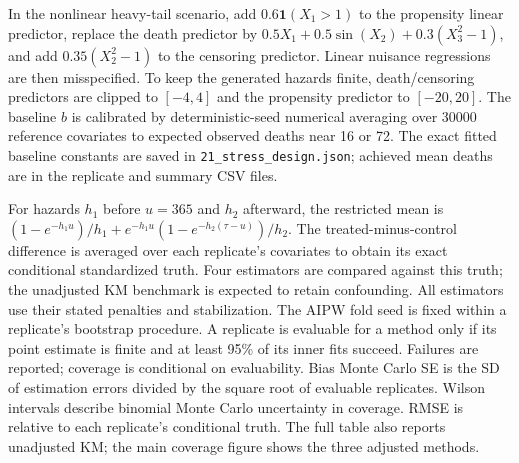 \documentclass[12pt,letterpaper]{article}
\begin{document}
In the nonlinear heavy-tail scenario, add $0.6\mathbf{1}(X_1>1)$ to the propensity linear predictor,
replace the death predictor by $0.5X_1+0.5\sin(X_2)+0.3(X_3^2-1)$, and add $0.35(X_2^2-1)$
to the censoring predictor. Linear nuisance regressions are then misspecified. To keep the generated
hazards finite, death/censoring predictors are clipped to $[-4,4]$ and the propensity predictor to $[-20,20]$.
The baseline $b$ is calibrated by deterministic-seed numerical averaging over 30000 reference covariates
to expected observed deaths near 16 or 72. The exact fitted baseline constants are saved in
\texttt{21\_stress\_design.json}; achieved mean deaths are in the replicate and summary CSV files.

For hazards $h_1$ before $u=365$ and $h_2$ afterward, the restricted mean is
$(1-e^{-h_1u})/h_1+e^{-h_1u}(1-e^{-h_2(\tau-u)})/h_2$.
The treated-minus-control difference is averaged over each replicate's covariates to obtain its exact
conditional standardized truth. Four estimators are compared against this truth; the unadjusted KM
benchmark is expected to retain confounding. All estimators use their stated penalties and stabilization.
The AIPW fold seed is fixed within a replicate's bootstrap procedure. A replicate is evaluable for a method
only if its point estimate is finite and at least 95\% of its inner fits succeed. Failures are reported;
coverage is conditional on evaluability. Bias Monte Carlo SE is the SD of estimation errors divided by
the square root of evaluable replicates. Wilson intervals describe binomial Monte Carlo uncertainty in coverage.
RMSE is relative to each replicate's conditional truth. The full table also reports unadjusted KM;
the main coverage figure shows the three adjusted methods.
\end{document}
